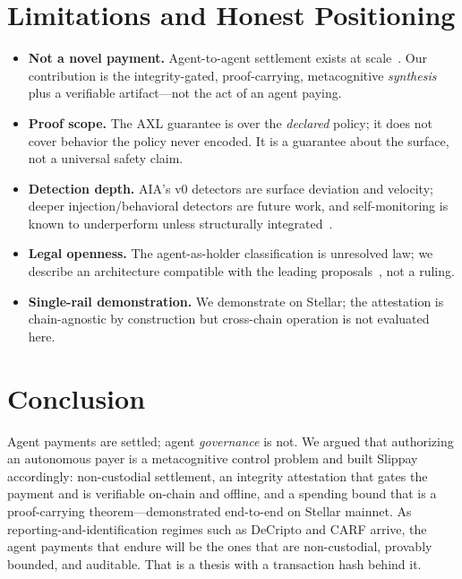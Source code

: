 \documentclass[11pt]{article}
\begin{document}
\section{Limitations and Honest Positioning}
\label{sec:limits}

\begin{itemize}
  \item \textbf{Not a novel payment.} Agent-to-agent settlement exists at
  scale~\citep{x402coinbase,googlex402}. Our contribution is the integrity-gated, proof-carrying,
  metacognitive \emph{synthesis} plus a verifiable artifact---not the act of an agent paying.
  \item \textbf{Proof scope.} The AXL guarantee is over the \emph{declared} policy; it does not
  cover behavior the policy never encoded. It is a guarantee about the surface, not a universal
  safety claim.
  \item \textbf{Detection depth.} AIA's v0 detectors are surface deviation and velocity; deeper
  injection/behavioral detectors are future work, and self-monitoring is known to underperform
  unless structurally integrated~\citep{negresult}.
  \item \textbf{Legal openness.} The agent-as-holder classification is unresolved law; we
  describe an architecture compatible with the leading proposals~\citep{countais,ueta}, not a
  ruling.
  \item \textbf{Single-rail demonstration.} We demonstrate on Stellar; the attestation is
  chain-agnostic by construction but cross-chain operation is not evaluated here.
\end{itemize}

\section{Conclusion}

Agent payments are settled; agent \emph{governance} is not. We argued that authorizing an
autonomous payer is a metacognitive control problem and built Slippay accordingly:
non-custodial settlement, an integrity attestation that gates the payment and is verifiable
on-chain and offline, and a spending bound that is a proof-carrying theorem---demonstrated
end-to-end on Stellar mainnet. As reporting-and-identification regimes such as DeCripto and CARF
arrive, the agent payments that endure will be the ones that are non-custodial, provably
bounded, and auditable. That is a thesis with a transaction hash behind it.
\end{document}
